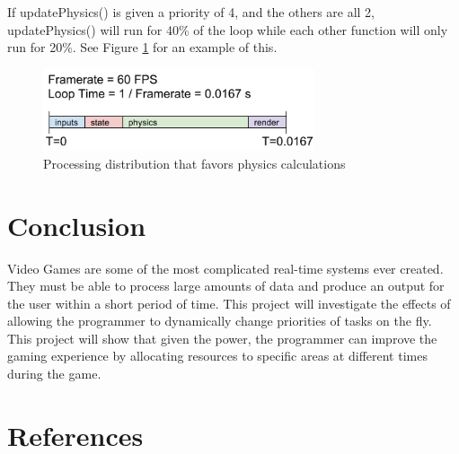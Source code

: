\documentclass[a4paper, 12pt]{article}
\begin{document}
        If updatePhysics() is given a priority of 4, and the others are all 2, updatePhysics() will run for 40\% of the loop while each other function will only run for 20\%. See Figure \ref{phys_priority} for an example of this.

        \begin{figure}[H]
            \includegraphics[width=8cm]{phys_priority.png}
            \centering
            \caption{Processing distribution that favors physics calculations}
            \label{phys_priority}
        \end{figure}

\section{Conclusion}
    Video Games are some of the most complicated real-time systems ever created. They must be able to process large amounts of data and produce an output for the user within a short period of time. This project will investigate the effects of allowing the programmer to dynamically change priorities of tasks on the fly. This project will show that given the power, the programmer can improve the gaming experience by allocating resources to specific areas at different times during the game.


\newpage

\section{References}
\end{document}
